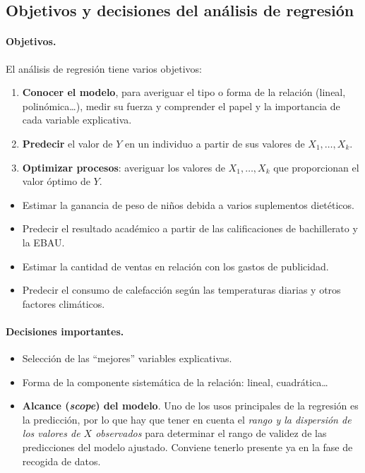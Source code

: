 \subsection{Objetivos y decisiones del análisis de regresión}

\paragraph{Objetivos.} El análisis de regresión tiene varios objetivos:
\begin{enumerate}
  \item \textbf{Conocer el modelo}, para averiguar el tipo o forma de la relación (lineal,
    polinómica\ldots), medir su fuerza y comprender el papel y la importancia de cada variable
    explicativa.
  \item \textbf{Predecir} el valor de $Y$ en un individuo a partir de sus valores de
    $X_1,\ldots,X_k$.
  \item \textbf{Optimizar procesos}: averiguar los valores de $X_1,\ldots,X_k$ que proporcionan
    el valor óptimo de $Y$.
\end{enumerate}

\begin{ejemplo}
  \begin{itemize}
    \item Estimar la ganancia de peso de niños debida a varios suplementos dietéticos.
    \item Predecir el resultado académico a partir de las calificaciones de bachillerato y la
      EBAU.
    \item Estimar la cantidad de ventas en relación con los gastos de publicidad.
    \item Predecir el consumo de calefacción según las temperaturas diarias y otros factores
      climáticos.
  \end{itemize}
\end{ejemplo}

\paragraph{Decisiones importantes.}
\begin{itemize}
  \item Selección de las ``mejores'' variables explicativas.
  \item Forma de la componente sistemática de la relación: lineal, cuadrática\ldots
  \item \textbf{Alcance (\emph{scope}) del modelo}. Uno de los usos principales de la
    regresión es la predicción, por lo que hay que tener en cuenta el \emph{rango y la
    dispersión de los valores de $X$ observados} para determinar el rango de validez de las
    predicciones del modelo ajustado. Conviene tenerlo presente ya en la fase de recogida de
    datos.
\end{itemize}

